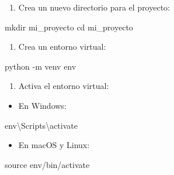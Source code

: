 \documentclass[
  a4paper,
  DIV=11,
  numbers=noendperiod,
  onepage,
  openany]{scrreprt}
\newenvironment{Shaded}{\begin{snugshade}}{\end{snugshade}}
\newcommand{\AttributeTok}[1]{\textcolor[rgb]{0.40,0.45,0.13}{#1}}
\newcommand{\BuiltInTok}[1]{\textcolor[rgb]{0.00,0.23,0.31}{#1}}
\newcommand{\DataTypeTok}[1]{\textcolor[rgb]{0.68,0.00,0.00}{#1}}
\newcommand{\ExtensionTok}[1]{\textcolor[rgb]{0.00,0.23,0.31}{#1}}
\newcommand{\FunctionTok}[1]{\textcolor[rgb]{0.28,0.35,0.67}{#1}}
\newcommand{\NormalTok}[1]{\textcolor[rgb]{0.00,0.23,0.31}{#1}}
\providecommand{\tightlist}{%
  \setlength{\itemsep}{0pt}\setlength{\parskip}{0pt}}\usepackage{longtable,booktabs,array}
\begin{document}
\begin{enumerate}
\def\labelenumi{\arabic{enumi}.}
\tightlist
\item
  Crea un nuevo directorio para el proyecto:
\end{enumerate}

\begin{Shaded}
\begin{Highlighting}[]
\FunctionTok{mkdir}\NormalTok{ mi\_proyecto}
\BuiltInTok{cd}\NormalTok{ mi\_proyecto}
\end{Highlighting}
\end{Shaded}

\begin{enumerate}
\def\labelenumi{\arabic{enumi}.}
\setcounter{enumi}{1}
\tightlist
\item
  Crea un entorno virtual:
\end{enumerate}

\begin{Shaded}
\begin{Highlighting}[]
\ExtensionTok{python} \AttributeTok{{-}m}\NormalTok{ venv env}
\end{Highlighting}
\end{Shaded}

\begin{enumerate}
\def\labelenumi{\arabic{enumi}.}
\setcounter{enumi}{2}
\tightlist
\item
  Activa el entorno virtual:
\end{enumerate}

\begin{itemize}
\tightlist
\item
  En Windows:
\end{itemize}

\begin{Shaded}
\begin{Highlighting}[]
\FunctionTok{env}\DataTypeTok{\textbackslash{}S}\NormalTok{cripts}\DataTypeTok{\textbackslash{}a}\NormalTok{ctivate}
\end{Highlighting}
\end{Shaded}

\begin{itemize}
\tightlist
\item
  En macOS y Linux:
\end{itemize}

\begin{Shaded}
\begin{Highlighting}[]
\BuiltInTok{source}\NormalTok{ env/bin/activate}
\end{Highlighting}
\end{Shaded}
\end{document}

